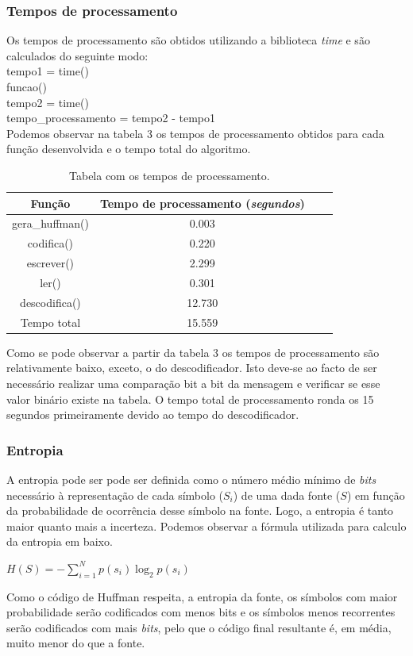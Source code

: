 \documentclass[12pt,a4paper]{article}
\begin{document}
\subsubsection{Tempos de processamento}
Os tempos de processamento são obtidos utilizando a biblioteca \textit{time} e são calculados do seguinte modo:\\
\newline
tempo1 = time()\\
funcao()\\
tempo2 = time()\\
tempo\_processamento = tempo2 - tempo1\\

Podemos observar na tabela 3 os tempos de processamento obtidos para cada função desenvolvida e o tempo total do algoritmo.

\begin{table}[h]
\centering
\label{my-label}
\begin{tabular}{|c|c|c|c|}
\hline
Função & Tempo de processamento (\textit{segundos})\\
\hline
gera\_huffman() & 0.003 \\ 
\hline
codifica()      & 0.220 \\ 
\hline
escrever()      & 2.299 \\ 
\hline
ler()           & 0.301 \\
\hline
descodifica()   & 12.730\\
\hline
Tempo total     & 15.559\\
\hline
\end{tabular}
\caption{Tabela com os tempos de processamento.}
\end{table}

Como se pode observar a partir da tabela 3 os tempos de processamento são relativamente baixo, exceto, o do descodificador. Isto deve-se ao facto de ser necessário realizar uma comparação bit a bit da mensagem e verificar se esse valor binário existe na tabela. O tempo total de processamento ronda os 15 segundos primeiramente devido ao tempo do descodificador.

\subsubsection{Entropia}
A entropia pode ser pode ser definida como o número médio mínimo de \textit{bits} necessário à representação de cada símbolo (\textit{$S_i$}) de uma dada fonte (\textit{$S$}) em função da probabilidade de ocorrência desse símbolo na fonte. Logo, a entropia é tanto maior quanto mais a incerteza. Podemos observar a fórmula utilizada para calculo da entropia em baixo.
\begin{center}
$H(S) = -\sum\limits_{i=1}^N p(s_i)\log_2p(s_i)$
\end{center}
Como o código de Huffman respeita, a entropia da fonte, os símbolos com maior probabilidade serão codificados com menos bits e os símbolos menos recorrentes serão codificados com mais \textit{bits}, pelo que o código final resultante é, em média, muito menor do que a fonte.
\end{document}
